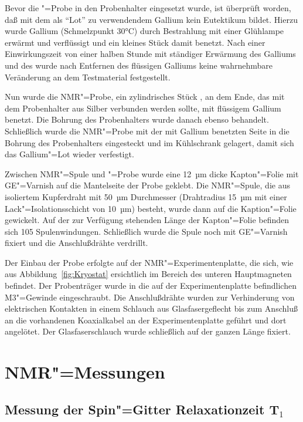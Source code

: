 Bevor die \aug"=Probe in den Probenhalter eingesetzt wurde, ist überprüft worden, daß \aug{} mit
dem als "`Lot"' zu verwendendem Gallium kein Eutektikum bildet. Hierzu wurde Gallium (Schmelzpunkt
30°C) durch Bestrahlung mit einer Glühlampe erwärmt und verflüssigt und ein kleines Stück \aug{}
damit benetzt. Nach einer Einwirkungszeit von einer halben Stunde mit ständiger Erwärmung des
Galliums und des \aug{} wurde nach Entfernen des flüssigen Galliums keine wahrnehmbare Veränderung
an dem \aug{} Testmaterial festgestellt.

Nun wurde die NMR"=Probe, ein zylindrisches Stück \aug{}, an dem Ende, das mit dem Probenhalter aus
Silber verbunden werden sollte, mit flüssigem Gallium benetzt. Die Bohrung des Probenhalters wurde
danach ebenso behandelt. Schließlich wurde die NMR"=Probe mit der mit
Gallium benetzten Seite in die Bohrung des Probenhalters eingesteckt und im Kühlschrank gelagert,
damit sich das Gallium"=Lot wieder verfestigt.

Zwischen NMR"=Spule und \aug"=Probe wurde eine 12~µm dicke Kapton"=Folie mit GE"=Varnish
auf die Mantelseite der Probe geklebt. Die NMR"=Spule, die aus isoliertem Kupferdraht mit 50~µm
Durchmesser (Drahtradius 15~µm mit einer Lack"=Isolationsschicht von 10~$µ$m) besteht, wurde dann
auf die Kaption"=Folie gewickelt. Auf der zur Verfügung stehenden Länge der Kapton"=Folie befinden
sich 105 Spulenwindungen. Schließlich wurde die Spule noch mit GE"=Varnish fixiert und die
Anschlußdrähte verdrillt.

Der Einbau der Probe erfolgte auf der NMR"=Experimentenplatte, die sich, wie aus
Abbildung~\ref{fig:Kryostat} ersichtlich im Bereich des unteren Hauptmagneten befindet. Der Probenträger wurde
in die auf der Experimentenplatte befindlichen M3"=Gewinde eingeschraubt. Die Anschlußdrähte wurden
zur Verhinderung von elektrischen Kontakten in einem Schlauch aus Glasfasergeflecht bis zum
Anschluß an die vorhandenen Koaxialkabel an der Experimentenplatte geführt und dort angelötet.
Der Glasfaserschlauch wurde schließlich auf der ganzen Länge fixiert.


\section{NMR"=Messungen}

\subsection{Messung der Spin"=Gitter Relaxationzeit T$_1$}

